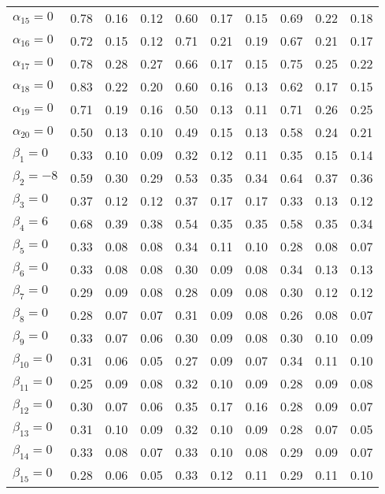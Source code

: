 \begin{table}[htbp]
\begin{tabular}{l|ccc|ccc|ccc}
  $\alpha_{15}=0$ & 0.78 & 0.16 & 0.12 & 0.60 & 0.17 & 0.15 & 0.69 & 0.22 & 0.18 \\ 
  $\alpha_{16}=0$ & 0.72 & 0.15 & 0.12 & 0.71 & 0.21 & 0.19 & 0.67 & 0.21 & 0.17 \\ 
  $\alpha_{17}=0$ & 0.78 & 0.28 & 0.27 & 0.66 & 0.17 & 0.15 & 0.75 & 0.25 & 0.22 \\ 
  $\alpha_{18}=0$ & 0.83 & 0.22 & 0.20 & 0.60 & 0.16 & 0.13 & 0.62 & 0.17 & 0.15 \\ 
  $\alpha_{19}=0$ & 0.71 & 0.19 & 0.16 & 0.50 & 0.13 & 0.11 & 0.71 & 0.26 & 0.25 \\ 
  $\alpha_{20}=0$ & 0.50 & 0.13 & 0.10 & 0.49 & 0.15 & 0.13 & 0.58 & 0.24 & 0.21 \\ 
  $\beta_{1}=0$ & 0.33 & 0.10 & 0.09 & 0.32 & 0.12 & 0.11 & 0.35 & 0.15 & 0.14 \\ 
  $\beta_{2}=-8$ & 0.59 & 0.30 & 0.29 & 0.53 & 0.35 & 0.34 & 0.64 & 0.37 & 0.36 \\ 
  $\beta_{3}=0$ & 0.37 & 0.12 & 0.12 & 0.37 & 0.17 & 0.17 & 0.33 & 0.13 & 0.12 \\ 
  $\beta_{4}=6$ & 0.68 & 0.39 & 0.38 & 0.54 & 0.35 & 0.35 & 0.58 & 0.35 & 0.34 \\ 
  $\beta_{5}=0$ & 0.33 & 0.08 & 0.08 & 0.34 & 0.11 & 0.10 & 0.28 & 0.08 & 0.07 \\ 
  $\beta_{6}=0$ & 0.33 & 0.08 & 0.08 & 0.30 & 0.09 & 0.08 & 0.34 & 0.13 & 0.13 \\ 
  $\beta_{7}=0$ & 0.29 & 0.09 & 0.08 & 0.28 & 0.09 & 0.08 & 0.30 & 0.12 & 0.12 \\ 
  $\beta_{8}=0$ & 0.28 & 0.07 & 0.07 & 0.31 & 0.09 & 0.08 & 0.26 & 0.08 & 0.07 \\ 
  $\beta_{9}=0$ & 0.33 & 0.07 & 0.06 & 0.30 & 0.09 & 0.08 & 0.30 & 0.10 & 0.09 \\ 
  $\beta_{10}=0$ & 0.31 & 0.06 & 0.05 & 0.27 & 0.09 & 0.07 & 0.34 & 0.11 & 0.10 \\ 
  $\beta_{11}=0$ & 0.25 & 0.09 & 0.08 & 0.32 & 0.10 & 0.09 & 0.28 & 0.09 & 0.08 \\ 
  $\beta_{12}=0$ & 0.30 & 0.07 & 0.06 & 0.35 & 0.17 & 0.16 & 0.28 & 0.09 & 0.07 \\ 
  $\beta_{13}=0$ & 0.31 & 0.10 & 0.09 & 0.32 & 0.10 & 0.09 & 0.28 & 0.07 & 0.05 \\ 
  $\beta_{14}=0$ & 0.33 & 0.08 & 0.07 & 0.33 & 0.10 & 0.08 & 0.29 & 0.09 & 0.07 \\ 
  $\beta_{15}=0$ & 0.28 & 0.06 & 0.05 & 0.33 & 0.12 & 0.11 & 0.29 & 0.11 & 0.10 \\ 

\end{tabular}
\end{table}
